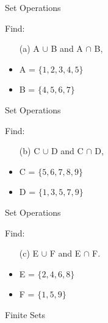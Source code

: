 \documentclass[11pt,a4paper,titlepage,oneside,openany]{article}
\numberwithin{equation}{section}
\numberwithin{algorithm}{section}
\numberwithin{figure}{section}
\numberwithin{table}{section}
\begin{document}
{%

{Set Operations}

Find: 
\begin{itemize}
\item[(a)] A $\cup$ B and A $\cap$ B, \bigskip
\item A = $\{1, 2, 3, 4, 5\}$  
\item B = $\{4, 5, 6, 7\}$  
\end{itemize}



{Set Operations}

Find: 
\begin{itemize}
\item[(b)] C $\cup$ D and C $\cap$ D,  \bigskip
\item C = $\{5, 6, 7, 8, 9\}$
\item D = $\{1, 3, 5, 7, 9\}$
\end{itemize}



{Set Operations}

Find: 
\begin{itemize}
\item[(c)] E $\cup$ F and E $\cap$ F. \bigskip
\item E = $\{2, 4, 6, 8\}$

\item F = $\{1, 5, 9\}$
\end{itemize}




{Finite Sets}

}
\end{document}
